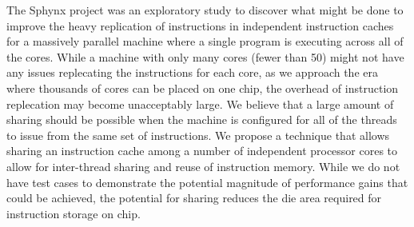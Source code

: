 The Sphynx project was an exploratory study to discover what might be
done to improve the heavy replication of instructions in independent
instruction caches for a massively parallel machine where a single
program is executing across all of the cores. 
While a machine with only many cores (fewer than 50) might not have
any issues replecating the instructions for each core, as we approach
the era where thousands of cores can be placed on one chip, the
overhead of instruction replecation may become unacceptably large.
We believe that a large amount of sharing should be possible when the
machine is configured for all of the threads to issue from the same
set of instructions.
We propose a technique that allows sharing an instruction cache among
a number of independent processor cores to allow for inter-thread
sharing and reuse of instruction memory.
While we do not have test cases to demonstrate the potential magnitude
of performance gains that could be achieved, the potential for sharing
reduces the die area required for instruction storage on chip.
